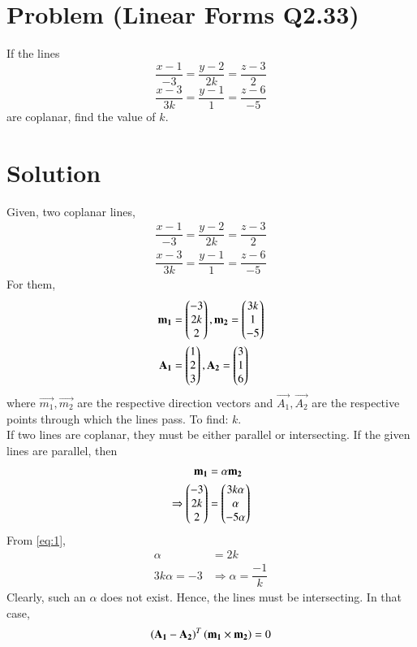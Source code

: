 \documentclass[journal,12pt,twocolumn]{IEEEtran}
\begin{document}
\section{Problem (Linear Forms Q2.33)}
If the lines
$$\dfrac{x-1}{-3}=\dfrac{y-2}{2k}=\dfrac{z-3}{2}$$
$$\dfrac{x-3}{3k}=\dfrac{y-1}{1}=\dfrac{z-6}{-5}$$
are coplanar, find the value of $k$.
\section{Solution}
Given, two coplanar lines,
\begin{align}
\dfrac{x-1}{-3}=\dfrac{y-2}{2k}=\dfrac{z-3}{2}\\
\dfrac{x-3}{3k}=\dfrac{y-1}{1}=\dfrac{z-6}{-5}
\end{align}
For them,
\begin{align}
    \mathbf{m_{1}}&=\begin{pmatrix}-3\\
    2k\\
    2\end{pmatrix}, \mathbf{m_{2}}=\begin{pmatrix}3k\\
    1\\
    -5\end{pmatrix}\\
    \mathbf{A_{1}}&=\begin{pmatrix}1\\
    2\\
    3\end{pmatrix}, \mathbf{A_{2}}=\begin{pmatrix}3\\
    1\\
    6\end{pmatrix}
\end{align}
where $\vec{m_{1}},\vec{m_{2}}$ are the respective direction vectors and $\vec{A_{1}},\vec{A_{2}}$ are the respective points through which the lines pass. To find: $k$.\\
If two lines are coplanar, they must be either parallel or intersecting. If the given lines are parallel, then
\begin{align}
    \mathbf{m_{1}}&=\alpha\mathbf{m_{2}}\\
    \Rightarrow\begin{pmatrix}-3\\
    2k\\
    2\end{pmatrix}&=\begin{pmatrix}3k\alpha\\
    \alpha\\
    -5\alpha\end{pmatrix}\label{eq:1}
\end{align}
From \eqref{eq:1},
\begin{align}
    \alpha&=2k\\
    3k\alpha=-3&\Rightarrow \alpha=\dfrac{-1}{k}
\end{align}
Clearly, such an $\alpha$ does not exist. Hence, the lines must be intersecting. In that case,
\begin{align}
    \left(\mathbf{A_{1}}-\mathbf{A_{2}}\right)^{T}\left(\mathbf{m_{1}}\times\mathbf{m_{2}}\right)=0\label{eq:a}
\end{align}
\end{document}
